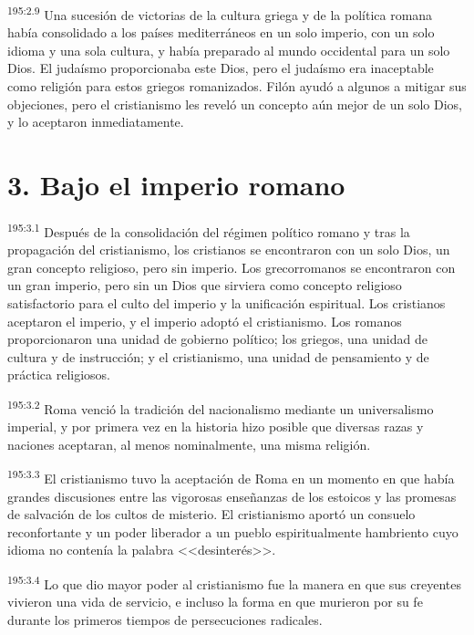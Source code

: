 \par 
\textsuperscript{195:2.9} Una sucesión de victorias de la cultura griega y de la política romana había consolidado a los países mediterráneos en un solo imperio, con un solo idioma y una sola cultura, y había preparado al mundo occidental para un solo Dios. El judaísmo proporcionaba este Dios, pero el judaísmo era inaceptable como religión para estos griegos romanizados. Filón ayudó a algunos a mitigar sus objeciones, pero el cristianismo les reveló un concepto aún mejor de un solo Dios, y lo aceptaron inmediatamente.

\section*{3. Bajo el imperio romano}
\par 
\textsuperscript{195:3.1} Después de la consolidación del régimen político romano y tras la propagación del cristianismo, los cristianos se encontraron con un solo Dios, un gran concepto religioso, pero sin imperio. Los grecorromanos se encontraron con un gran imperio, pero sin un Dios que sirviera como concepto religioso satisfactorio para el culto del imperio y la unificación espiritual. Los cristianos aceptaron el imperio, y el imperio adoptó el cristianismo. Los romanos proporcionaron una unidad de gobierno político; los griegos, una unidad de cultura y de instrucción; y el cristianismo, una unidad de pensamiento y de práctica religiosos.

\par 
\textsuperscript{195:3.2} Roma venció la tradición del nacionalismo mediante un universalismo imperial, y por primera vez en la historia hizo posible que diversas razas y naciones aceptaran, al menos nominalmente, una misma religión.

\par 
\textsuperscript{195:3.3} El cristianismo tuvo la aceptación de Roma en un momento en que había grandes discusiones entre las vigorosas enseñanzas de los estoicos y las promesas de salvación de los cultos de misterio. El cristianismo aportó un consuelo reconfortante y un poder liberador a un pueblo espiritualmente hambriento cuyo idioma no contenía la palabra <<desinterés>>.

\par 
\textsuperscript{195:3.4} Lo que dio mayor poder al cristianismo fue la manera en que sus creyentes vivieron una vida de servicio, e incluso la forma en que murieron por su fe durante los primeros tiempos de persecuciones radicales.

